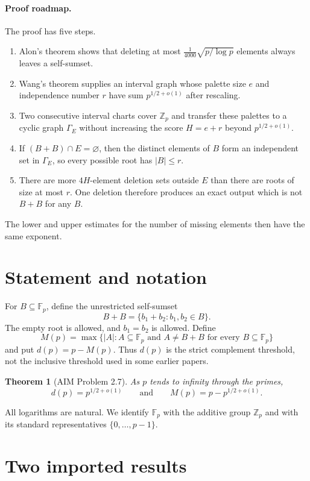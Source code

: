 \documentclass[11pt]{article}
\newtheorem{theorem}{Theorem}
\theoremstyle{definition}
\newcommand{\Fp}{\mathbb F_p}
\newcommand{\Zp}{\mathbb Z_p}
\begin{document}
\paragraph{Proof roadmap.}
The proof has five steps.
\begin{enumerate}
  \item Alon's theorem shows that deleting at most
  $\frac1{4000}\sqrt{p/\log p}$ elements always leaves a self-sumset.
  \item Wang's theorem supplies an interval graph whose palette size $e$ and
  independence number $r$ have sum $p^{1/2+o(1)}$ after rescaling.
  \item Two consecutive interval charts cover $\mathbb Z_p$ and transfer
  these palettes to a cyclic graph $\Gamma_E$ without increasing the score
  $H=e+r$ beyond $p^{1/2+o(1)}$.
  \item If $(B+B)\cap E=\varnothing$, then the distinct elements of $B$ form
  an independent set in $\Gamma_E$, so every possible root has $|B|\le r$.
  \item There are more $4H$-element deletion sets outside $E$ than there are
  roots of size at most $r$.  One deletion therefore produces an exact output
  which is not $B+B$ for any $B$.
\end{enumerate}
The lower and upper estimates for the number of missing elements then have
the same exponent.

\section{Statement and notation}

For $B\subseteq\Fp$, define the unrestricted self-sumset
\[
  B+B=\{b_1+b_2:b_1,b_2\in B\}.
\]
The empty root is allowed, and $b_1=b_2$ is allowed.  Define
\[
  M(p)=\max\{|A|:A\subseteq\Fp\text{ and }A\ne B+B
                    \text{ for every }B\subseteq\Fp\}
\]
and put $d(p)=p-M(p)$.  Thus $d(p)$ is the strict complement threshold,
not the inclusive threshold used in some earlier papers.

\begin{theorem}[AIM Problem 2.7]\label{thm:main}
As $p$ tends to infinity through the primes,
\[
  d(p)=p^{1/2+o(1)}
  \qquad\text{and}\qquad
  M(p)=p-p^{1/2+o(1)}.
\]
\end{theorem}

All logarithms are natural.  We identify $\Fp$ with the additive group
$\Zp$ and with its standard representatives $\{0,\ldots,p-1\}$.

\section{Two imported results}
\end{document}
